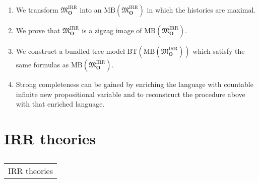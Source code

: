 \documentclass[xcolor=x11names]{beamer}
\makeatletter
\let\beamer@writeslidentry@miniframeson=\beamer@writeslidentry
\def\beamer@writeslidentry@miniframesoff{%
  \expandafter\beamer@ifempty\expandafter{\beamer@framestartpage}{}%
  {%
    \clearpage\beamer@notesactions%
  }
}
\newcommand*{\miniframeson}{\let\beamer@writeslidentry=\beamer@writeslidentry@miniframeson}
\newcommand*{\miniframesoff}{\let\beamer@writeslidentry=\beamer@writeslidentry@miniframesoff}
\newcommand{\cimdia}[1] {\miniframesoff \begin{frame}\begin{center}\huge \begin{tabular}{c}#1\end{tabular}\end{center}\end{frame}\miniframeson}
\newcommand{\szakasz}[2][]{\section{#1}\subsection{}\cimdia{#2}}
\newcommand{\bemph}[1] {{\color{DeepSkyBlue3}{#1}}}
\newcommand{\magyi}[1]{\textup{\bemph{\tiny #1}}}
\makeatother
\begin{document}
\begin{frame}[t]
\begin{enumerate}
\item We transform $\mathfrak M_{\mathbf{O}}^{\mathrm{IRR}}$ into an $\mathrm {MB}(\mathfrak M_{\mathbf{O}}^{\mathrm{IRR}})$ in which the histories are maximal.
\item We prove that $\mathfrak M_{\mathbf{O}}^{\mathrm{IRR}}$ is a zigzag image of $\mathrm {MB}(\mathfrak M_{\mathbf{O}}^{\mathrm{IRR}})$.
\\ \magyi{We can conclude a weak completeness theorem for Kamp semantics}
\item We construct a bundled tree model $\mathrm{BT}(\mathrm {MB}(\mathfrak M_{\mathbf{O}}^{\mathrm{IRR}}))$ which satisfy the same formulas as $\mathrm {MB}(\mathfrak M_{\mathbf{O}}^{\mathrm{IRR}})$.
\\ \magyi{We can conclude a weak completeness theorem for bundled tree semantics}
\item Strong completeness can be gained by enriching the language with countable infinite new propositional variable and to reconstruct the procedure above with that enriched language.
\end{enumerate}
\end{frame}
\szakasz[IRR theories]{IRR theories}
\end{document}
